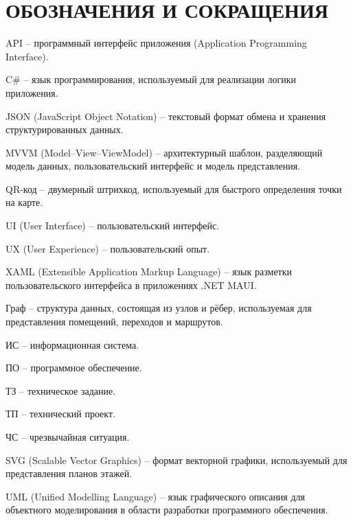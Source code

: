 \section*{ОБОЗНАЧЕНИЯ И СОКРАЩЕНИЯ}

API -- программный интерфейс приложения (Application Programming Interface).

C\# -- язык программирования, используемый для реализации логики приложения.

JSON (JavaScript Object Notation) -- текстовый формат обмена и хранения структурированных данных.

MVVM (Model--View--ViewModel) -- архитектурный шаблон, разделяющий модель данных, пользовательский интерфейс и модель представления.

QR-код -- двумерный штрихкод, используемый для быстрого определения точки на карте.

UI (User Interface) -- пользовательский интерфейс.

UX (User Experience) -- пользовательский опыт.

XAML (Extensible Application Markup Language) -- язык разметки пользовательского интерфейса в приложениях .NET MAUI.

Граф -- структура данных, состоящая из узлов и рёбер, используемая для представления помещений, переходов и маршрутов.

ИС -- информационная система.

ПО -- программное обеспечение.

ТЗ -- техническое задание.

ТП -- технический проект.

ЧС -- чрезвычайная ситуация.

SVG (Scalable Vector Graphics) -- формат векторной графики, используемый для представления планов этажей.

UML (Unified Modelling Language) -- язык графического описания для объектного моделирования в области разработки программного обеспечения.
